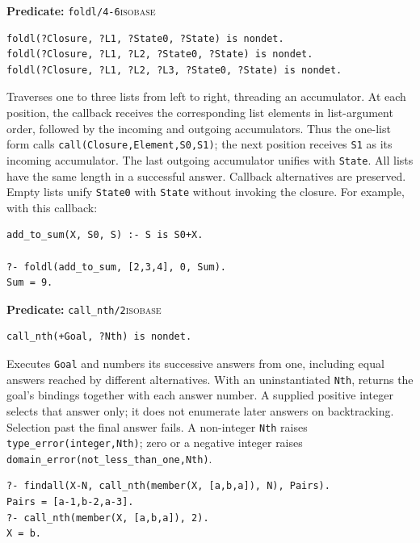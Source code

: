 \par{}
\noindent \textbf{Predicate:} \texttt{foldl/4-6}\hfill\textsc{isobase}
\begin{verbatim}
foldl(?Closure, ?L1, ?State0, ?State) is nondet.
foldl(?Closure, ?L1, ?L2, ?State0, ?State) is nondet.
foldl(?Closure, ?L1, ?L2, ?L3, ?State0, ?State) is nondet.
\end{verbatim}
\noindent Traverses one to three lists from left to right, threading an
accumulator. At each position, the callback receives the corresponding list
elements in list-argument order, followed by the incoming and outgoing
accumulators. Thus the one-list form calls \texttt{call(Closure,Element,S0,S1)};
the next position receives \texttt{S1} as its incoming accumulator. The last
outgoing accumulator unifies with \texttt{State}. All lists have the same
length in a successful answer. Callback alternatives are preserved. Empty
lists unify \texttt{State0} with \texttt{State} without invoking the closure.
For example, with this callback:
\begin{verbatim}
add_to_sum(X, S0, S) :- S is S0+X.

?- foldl(add_to_sum, [2,3,4], 0, Sum).
Sum = 9.
\end{verbatim}

\par{}
\noindent \textbf{Predicate:} \texttt{call\_nth/2}\hfill\textsc{isobase}
\begin{verbatim}
call_nth(+Goal, ?Nth) is nondet.
\end{verbatim}
\noindent Executes \texttt{Goal} and numbers its successive answers from one,
including equal answers reached by different alternatives. With an
uninstantiated \texttt{Nth}, returns the goal's bindings together with each
answer number. A supplied positive integer selects that answer only; it does
not enumerate later answers on backtracking. Selection past the final answer
fails. A non-integer \texttt{Nth} raises \texttt{type\_error(integer,Nth)};
zero or a negative integer raises
\texttt{domain\_error(not\_less\_than\_one,Nth)}.
\begin{verbatim}
?- findall(X-N, call_nth(member(X, [a,b,a]), N), Pairs).
Pairs = [a-1,b-2,a-3].
?- call_nth(member(X, [a,b,a]), 2).
X = b.
\end{verbatim}

